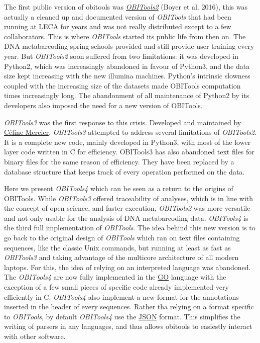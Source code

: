 \documentclass[
  letterpaper,
  DIV=11,
  numbers=noendperiod]{scrreprt}
\begin{document}
The first public version of obitools was
\href{https://metabarcoding.org/obitools}{\emph{OBITools2}} (Boyer et
al. 2016), this was actually a cleaned up and documented version of
\emph{OBITools} that had been running at LECA for years and was not
really distributed except to a few collaborators. This is where
\emph{OBITools} started its public life from then on. The DNA
metabarcoding spring schools provided and still provide user training
every year. But \emph{OBITools2} soon suffered from two limitations: it
was developed in Python2, which was increasingly abandoned in favour of
Python3, and the data size kept increasing with the new illumina
machines. Python's intrinsic slowness coupled with the increasing size
of the datasets made OBITools computation times increasingly long. The
abandonment of all maintenance of Python2 by its developers also imposed
the need for a new version of OBITools.

\href{https://metabarcoding.org/obitools3}{\emph{OBITools3}} was the
first response to this crisis. Developed and maintained by
\href{https://www.celine-mercier.info}{Céline Mercier}, \emph{OBITools3}
attempted to address several limitations of \emph{OBITools2}. It is a
complete new code, mainly developed in Python3, with most of the lower
layer code written in C for efficiency. OBITools3 has also abandoned
text files for binary files for the same reason of efficiency. They have
been replaced by a database structure that keeps track of every
operation performed on the data.

Here we present \emph{OBITools4} which can be seen as a return to the
origins of OBITools. While \emph{OBITools3} offered traceability of
analyses, which is in line with the concept of open science, and faster
execution, \emph{OBITools2} was more versatile and not only usable for
the analysis of DNA metabarcoding data. \emph{OBITools4} is the third
full implementation of \emph{OBITools}. The idea behind this new version
is to go back to the original design of \emph{OBITools} which ran on
text files containing sequences, like the classic Unix commands, but
running at least as fast as \emph{OBITools3} and taking advantage of the
multicore architecture of all modern laptops. For this, the idea of
relying on an interpreted language was abandoned. The \emph{OBITools4}
are now fully implemented in the \href{https://go.dev}{GO} language with
the exception of a few small pieces of specific code already implemented
very efficiently in C. \emph{OBITools4} also implement a new format for
the annotations inserted in the header of every sequences. Rather tha
relying on a format specific to \emph{OBITools}, by default
\emph{OBITools4} use the \href{https://www.json.org}{JSON} format. This
simplifies the writing of parsers in any languages, and thus allows
obitools to easiestly interact with other software.
\end{document}
